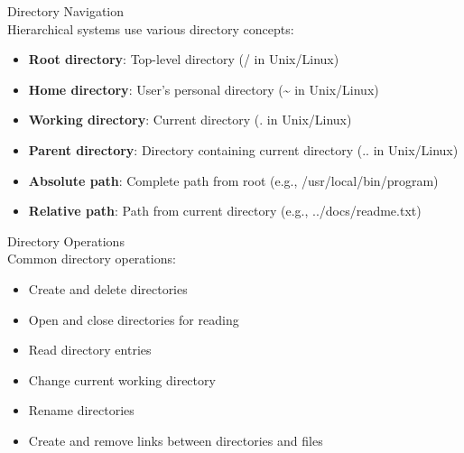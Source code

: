 \begin{definition}{Directory Navigation}\\
    Hierarchical systems use various directory concepts:
    \begin{itemize}
        \item \textbf{Root directory}: Top-level directory (/ in Unix/Linux)
        \item \textbf{Home directory}: User's personal directory (\textasciitilde{} in Unix/Linux)
        \item \textbf{Working directory}: Current directory (. in Unix/Linux)
        \item \textbf{Parent directory}: Directory containing current directory (.. in Unix/Linux)
        \item \textbf{Absolute path}: Complete path from root (e.g., /usr/local/bin/program)
        \item \textbf{Relative path}: Path from current directory (e.g., ../docs/readme.txt)
    \end{itemize}
\end{definition}

\begin{definition}{Directory Operations}\\
    Common directory operations:
    \begin{itemize}
        \item Create and delete directories
        \item Open and close directories for reading
        \item Read directory entries
        \item Change current working directory
        \item Rename directories
        \item Create and remove links between directories and files
    \end{itemize}
\end{definition}


